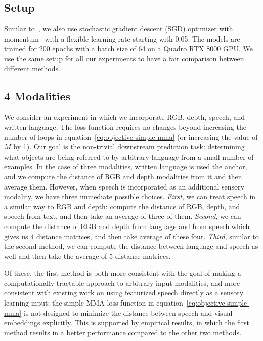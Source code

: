 \documentclass[sigconf,natbib=true,anonymous=true]{acmart}
\begin{document}
\subsection{Setup}
\label{sec:setup}

Similar to~\citet{NEURIPS2020_supervised_contrastive}, we also use stochastic gradient descent (SGD) optimizer with momentum~\cite{ruder2016overviewSGD} with a flexible learning rate starting with 0.05.
The models are trained for 200 epochs with a batch size of 64 on a Quadro RTX 8000 GPU.
We use the same setup for all our experiments to have a fair comparison between different methods.



\subsection{4 Modalities}
We consider an experiment in which we incorporate RGB, depth, speech, and written language. The loss function requires no changes beyond increasing the number of loops in equation~\ref{eq:objective-simple-mma} (or increasing the value of $M$ by 1). Our goal is the non-trivial downstream prediction task: determining what objects are being referred to by arbitrary language from a small number of examples. In the case of three modalities, written language is used the anchor, and we compute the distance of RGB and depth modalities from it and then average them. However, when speech is incorporated as an additional sensory modality, we have three immediate possible choices. \textit{First}, we can treat speech in a similar way to RGB and depth: compute the distance of RGB, depth, and speech from text, and then take an average of three of them. \textit{Second}, we can compute the distance of RGB and depth from language and from speech which gives us 4 distance matrices, and then take average of these four. \textit{Third}, similar to the second method, we can compute the distance between language and speech as well and then take the average of 5 distance matrices. 

Of these, the first method is both more consistent with the goal of making a computationally tractable approach to arbitrary input modalities, and more consistent with existing work on using featurized speech directly as a sensory learning input; the simple MMA loss function in equation~\ref{eq:objective-simple-mma} is not designed to minimize the distance between speech and visual embeddings explicitly. This is supported by empirical results, in which the first method results in a better performance compared to the other two methods. 
\end{document}
